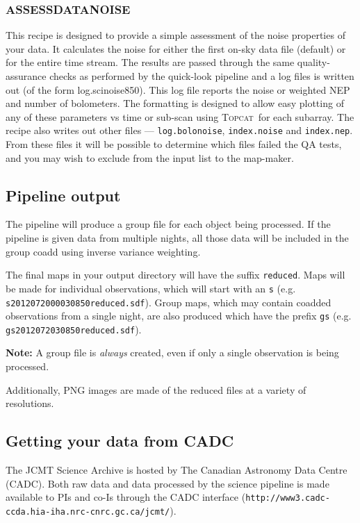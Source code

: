 \documentclass[twoside,11pt]{article}
\newcommand{\htmladdnormallink}[2]{#1}
\newcommand{\xlabel}[1]{}
\renewcommand{\_}{\texttt{\symbol{95}}}
\newcommand{\topcat}{\htmladdnormallink{\textsc{Topcat}}{http://www.starlink.ac.uk/topcat}}
\begin{document}
\subsubsection{\xlabel{assessnoise}ASSESS\_DATA\_NOISE}

This recipe is designed to provide a simple assessment of the noise
properties of your data. It calculates the noise for either the first
on-sky data file (default) or for the entire time stream. The results
are passed through the same quality-assurance checks as performed by
the quick-look pipeline and a log files is written out (of the form
log.scinoise850). This log file reports the noise or weighted NEP and
number of bolometers. The formatting is designed to allow easy
plotting of any of these parameters vs time or sub-scan using \topcat\
for each subarray. The recipe also writes out other files ---
\texttt{log.bolonoise}, \texttt{index.noise} and \texttt{index.nep}.
From these files it will be possible to determine which files failed
the QA tests, and you may wish to exclude from the input list to the
map-maker.

\subsection{\xlabel{pl_output}Pipeline output}

The pipeline will produce a group file for each object being
processed. If the pipeline is given data from multiple nights, all
those data will be included in the group coadd using inverse variance
weighting.

The final maps in your output directory will have the suffix
\texttt{\_reduced}. Maps will be made for individual observations,
which will start with an \texttt{s} (e.g.
\texttt{s20120720\_00030\_850\_reduced.sdf}). Group maps, which may contain
coadded observations from a single night, are also produced which
have the prefix \texttt{gs} (e.g. \texttt{gs20120720\_30\_850\_reduced.sdf}).

\textbf{Note:} A group file is \emph{always} created, even if only a single
observation is being processed.

Additionally, PNG images are made of the reduced files at a variety of
resolutions.

\subsection{\xlabel{cadc}Getting your data from CADC}

The JCMT Science Archive is hosted by The Canadian Astronomy Data
Centre (CADC). Both raw data and data processed by the science pipeline
is made available to PIs and co-Is through the CADC interface
(\texttt{http://www3.cadc-ccda.hia-iha.nrc-cnrc.gc.ca/jcmt/}).
\end{document}
